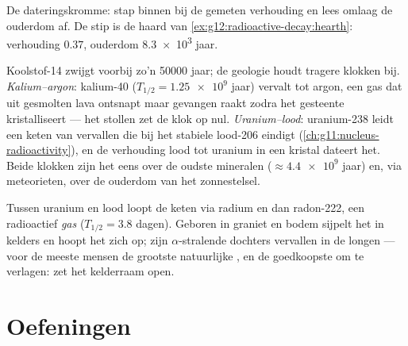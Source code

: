 \begin{omfigure}

{\small De dateringskromme: stap binnen bij de gemeten verhouding en lees
omlaag de ouderdom af. De stip is de haard van
\cref{ex:g12:radioactive-decay:hearth}: verhouding $0.37$, ouderdom
\num{8.3e3} jaar.}
\end{omfigure}

\begin{example}\label{ex:g12:radioactive-decay:rocks}
Koolstof-14 zwijgt voorbij zo'n \num{50000} jaar; de geologie houdt tragere
klokken bij. \emph{Kalium--argon}: kalium-40 ($T_{1/2} = \num{1.25e9}$ jaar)
vervalt tot argon, een gas dat uit gesmolten lava ontsnapt maar gevangen raakt
zodra het gesteente kristalliseert --- het stollen zet de klok op nul.
\emph{Uranium--lood}: uranium-238 leidt een keten van vervallen die bij het
stabiele lood-206 eindigt (\cref{ch:g11:nucleus-radioactivity}), en de
verhouding lood tot uranium in een kristal dateert het. Beide klokken zijn het
eens over de oudste mineralen ($\approx \num{4.4e9}$ jaar) en, via
meteorieten, over de ouderdom van het zonnestelsel.
\end{example}

\begin{remark}\label{rem:g12:radioactive-decay:radon}
Tussen uranium en lood loopt de keten via radium en dan radon-222, een
radioactief \emph{gas} ($T_{1/2} = 3.8$ dagen). Geboren in graniet en bodem
sijpelt het in kelders en hoopt het zich op; zijn $\alpha$-stralende dochters
vervallen in de longen --- voor de meeste mensen de grootste natuurlijke ,
en de goedkoopste om te verlagen: zet het kelderraam open.
\end{remark}

\section{Oefeningen}

